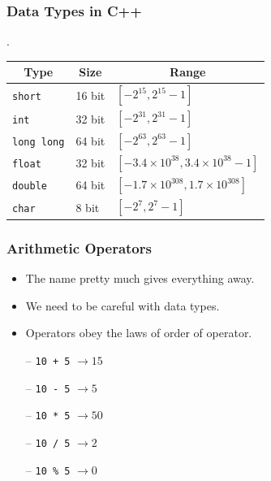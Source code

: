 \documentclass{beamer}
\begin{document}
\begin{frame}
    \frametitle{Data Types in C++}

    \begin{table}[]
        \bgroup
        \def\arraystretch{1.5}
        \setlength\tabcolsep{10pt}.
        \begin{tabular}{l|l|l}
            \multicolumn{1}{c|}{\textbf{Type}} & \multicolumn{1}{c|}{\textbf{Size}} & \multicolumn{1}{c}{\textbf{Range}} \\ \hline
            \texttt{short} & 16 bit & $[-2^{15}, 2^{15} - 1]$ \\
            \texttt{int} & 32 bit & $[-2^{31}, 2^{31} - 1]$ \\
            \texttt{long long} & 64 bit & $[-2^{63}, 2^{63} - 1]$ \\
            \texttt{float} & 32 bit & $[-3.4 \times 10^{38}, 3.4 \times 10^{38} - 1]$ \\
            \texttt{double} & 64 bit & $[-1.7 \times 10^{308}, 1.7 \times 10^{308}]$ \\
            \texttt{char} & 8 bit & $[-2^{7}, 2^{7} - 1]$                          
        \end{tabular}
        \egroup
    \end{table}
\end{frame}
    
\begin{frame}
    \frametitle{Arithmetic Operators}

    \begin{itemize}
        \item The name pretty much gives everything away.
        \item We need to be careful with data types.
        \item Operators obey the laws of order of operator.
    \end{itemize}

    \begin{tcolorbox}[title=Operators]
        \begin{itemize}
            \item[--] \texttt{10 + 5} $\rightarrow 15$
            \item[--] \texttt{10 - 5} $\rightarrow 5$
            \item[--] \texttt{10 * 5} $\rightarrow 50$
            \item[--] \texttt{10 / 5} $\rightarrow 2$
            \item[--] \texttt{10 \% 5} $\rightarrow 0$
        \end{itemize}
    \end{tcolorbox}
\end{frame}
\end{document}
